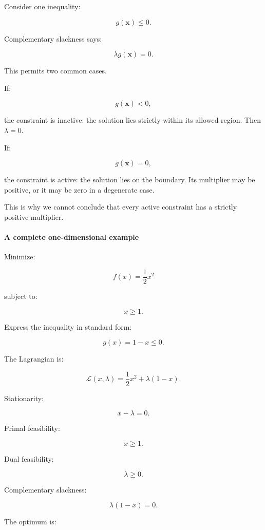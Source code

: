 \hypertarget{02-foundations-ii-ch026-complementary-slackness-intuition}{}

Consider one inequality:

\[
g(\mathbf x)\le0.
\]

Complementary slackness says:

\[
\lambda g(\mathbf x)=0.
\]

This permits two common cases.

If:

\[
g(\mathbf x)<0,
\]

the constraint is inactive: the solution lies strictly within its allowed region. Then \(\lambda=0\).

If:

\[
g(\mathbf x)=0,
\]

the constraint is active: the solution lies on the boundary. Its multiplier may be positive, or it may be zero in a degenerate case.

This is why we cannot conclude that every active constraint has a strictly positive multiplier.

\paragraph{A complete one-dimensional example}\label{02-foundations-ii-ch026-a-complete-one-dimensional-example}

\hypertarget{02-foundations-ii-ch026-a-complete-one-dimensional-example}{}

Minimize:

\[
f(x)=\frac12x^2
\]

subject to:

\[
x\ge1.
\]

Express the inequality in standard form:

\[
g(x)=1-x\le0.
\]

The Lagrangian is:

\[
\mathcal L(x,\lambda) = \frac12x^2+\lambda(1-x).
\]

Stationarity:

\[
x-\lambda=0.
\]

Primal feasibility:

\[
x\ge1.
\]

Dual feasibility:

\[
\lambda\ge0.
\]

Complementary slackness:

\[
\lambda(1-x)=0.
\]

The optimum is:

